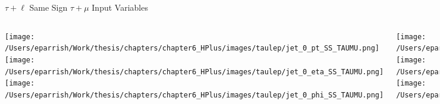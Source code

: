\documentclass[aspectratio=169,xcolor=table]{beamer}
\begin{document}
    \begin{frame}[t]{$\tau+\ell$ Same Sign $\tau+\mu$ Input Variables}
      \begin{columns}[t]
          \texttt{[image: /Users/eparrish/Work/thesis/chapters/chapter6\_HPlus/images/taulep/jet\_0\_pt\_SS\_TAUMU.png]}
          \texttt{[image: /Users/eparrish/Work/thesis/chapters/chapter6\_HPlus/images/taulep/jet\_0\_eta\_SS\_TAUMU.png]}
          \texttt{[image: /Users/eparrish/Work/thesis/chapters/chapter6\_HPlus/images/taulep/jet\_0\_phi\_SS\_TAUMU.png]}

          \texttt{[image: /Users/eparrish/Work/thesis/chapters/chapter6\_HPlus/images/taulep/lep\_0\_pt\_SS\_TAUMU.png]}
          \texttt{[image: /Users/eparrish/Work/thesis/chapters/chapter6\_HPlus/images/taulep/lep\_0\_eta\_SS\_TAUMU.png]}
          \texttt{[image: /Users/eparrish/Work/thesis/chapters/chapter6\_HPlus/images/taulep/lep\_0\_phi\_SS\_TAUMU.png]}

          \texttt{[image: /Users/eparrish/Work/thesis/chapters/chapter6\_HPlus/images/taulep/el\_0\_pt\_SS\_TAUMU.png]}
          \texttt{[image: /Users/eparrish/Work/thesis/chapters/chapter6\_HPlus/images/taulep/el\_0\_eta\_SS\_TAUMU.png]}
          \texttt{[image: /Users/eparrish/Work/thesis/chapters/chapter6\_HPlus/images/taulep/el\_0\_phi\_SS\_TAUMU.png]}

          \texttt{[image: /Users/eparrish/Work/thesis/chapters/chapter6\_HPlus/images/taulep/mu\_0\_pt\_SS\_TAUMU.png]}
          \texttt{[image: /Users/eparrish/Work/thesis/chapters/chapter6\_HPlus/images/taulep/mu\_0\_eta\_SS\_TAUMU.png]}
          \texttt{[image: /Users/eparrish/Work/thesis/chapters/chapter6\_HPlus/images/taulep/mu\_0\_phi\_SS\_TAUMU.png]}

      \end{columns}
    \end{frame}
\end{document}
